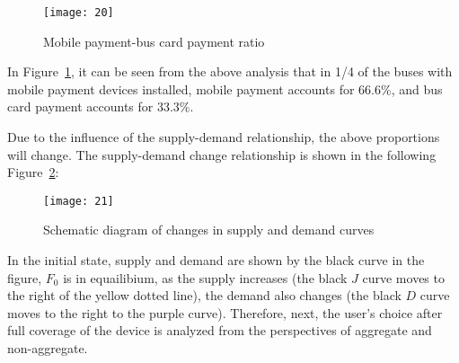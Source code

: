 \documentclass[../mcmpaper]{subfiles}
\begin{document}
\begin{figure}[!ht]
\centering
\texttt{[image: 20]}
\caption{Mobile payment-bus card payment ratio}
\label{fig:6.3}
\end{figure}
\par
In Figure~\ref{fig:6.3}, it can be seen from the above analysis that in 1/4 of the buses with mobile payment devices installed, mobile payment accounts for 66.6\%, and bus card payment accounts for 33.3\%.
\par
Due to the influence of the supply-demand relationship, the above proportions will change. The supply-demand change relationship is shown in the following Figure~\ref{fig:6.4}:
\begin{figure}[!ht]
\centering
\texttt{[image: 21]}
\caption{Schematic diagram of changes in supply and demand curves}
\label{fig:6.4}
\end{figure}
\par
In the initial state, supply and demand are shown by the black curve in the figure, $F_0$ is in equailibium, as the supply increases (the black $J$ curve moves to the right of the yellow dotted line), the demand also changes (the black $D$ curve moves to the right to the purple curve). Therefore, next, the user's choice after full coverage of the device is analyzed from the perspectives of aggregate and non-aggregate.
\end{document}

